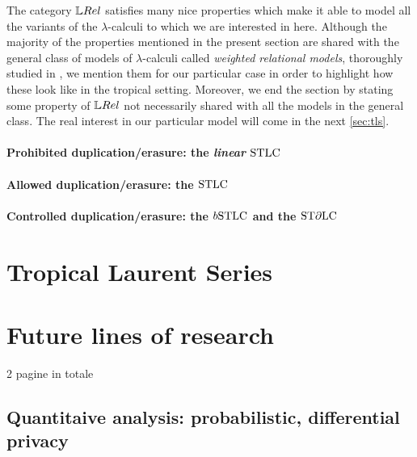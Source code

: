 \documentclass[a4paper,UKenglish,cleveref, autoref, thm-restate]{lipics-v2021}
\begin{document}
The category $\LREL$ satisfies many nice properties which make it able to model all the variants of the $\lambda$-calculi to which we are interested in here.
Although the majority of the properties mentioned in the present section are shared with the general class of models of $\lambda$-calculi called \emph{weighted relational models}, thoroughly studied in \cite{Manzo2013}, we mention them for our particular case in order to highlight how these look like in the tropical setting.
Moreover, we end the section by stating some property of $\LREL$ not necessarily shared with all the models in the general class.
The real interest in our particular model will come in the next \autoref{sec:tls}.

\paragraph{Prohibited duplication/erasure: the \emph{linear} $\mathrm{STLC}$}\label{sec:3A}

\paragraph{Allowed duplication/erasure: the $\mathrm{STLC}$}\label{sec:3B}

\paragraph{Controlled duplication/erasure: the $\BSTLC$ and the $\mathrm{ST}\partial\mathrm{LC}$}\label{sec:3C}


\section{Tropical Laurent Series}\label{sec:tls}


\section{Future lines of research}\label{sec:future}

{\color{red}2 pagine in totale}

\subsection{Quantitaive analysis: probabilistic, differential privacy}\label{sec:app}
%
%

\newpage
\end{document}

